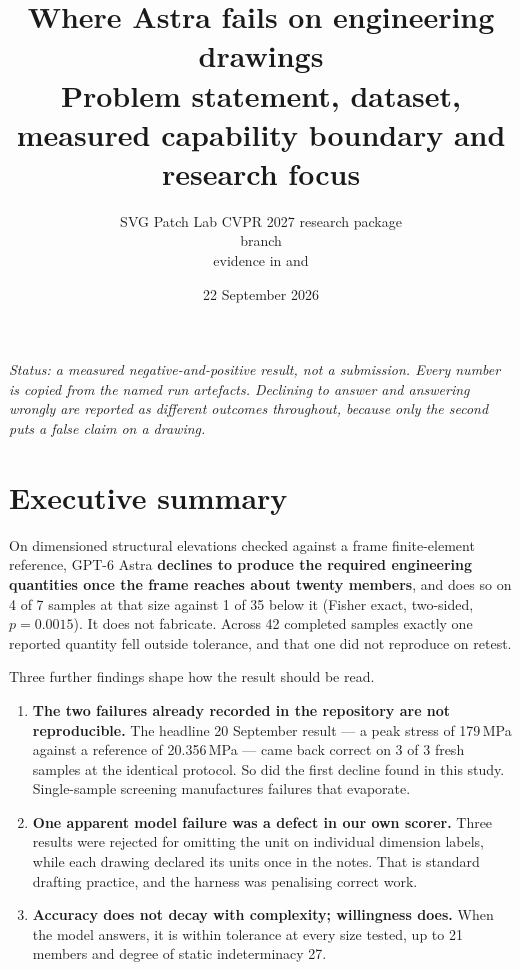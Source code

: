 \documentclass[11pt,a4paper]{article}
\title{\color{researchblue}\LARGE Where Astra fails on engineering drawings\\[6pt]
\Large Problem statement, dataset, measured capability boundary and research focus}
\author{SVG Patch Lab \quad\textbullet\quad CVPR 2027 research package\\
\small branch \code{cvpr2027-research-package}\\
\small evidence in \code{runs/eng-frame-*} and \code{runs/eng-frame-aggregate.json}}
\date{22 September 2026}
\newcommand{\code}[1]{\path{#1}}
\begin{document}
\maketitle

\begin{center}
\small\itshape
Status: a measured negative-and-positive result, not a submission. Every number is copied from the
named run artefacts. Declining to answer and answering wrongly are reported as different outcomes
throughout, because only the second puts a false claim on a drawing.
\end{center}

\tableofcontents

\section{Executive summary}

On dimensioned structural elevations checked against a frame finite-element reference, GPT-6 Astra
\textbf{declines to produce the required engineering quantities once the frame reaches about twenty
members}, and does so on 4 of 7 samples at that size against 1 of 35 below it (Fisher exact,
two-sided, $p = 0.0015$). It does not fabricate. Across 42 completed samples exactly one reported
quantity fell outside tolerance, and that one did not reproduce on retest.

Three further findings shape how the result should be read.

\begin{enumerate}
\item \textbf{The two failures already recorded in the repository are not reproducible.} The headline
      20 September result --- a peak stress of 179\,MPa against a reference of 20.356\,MPa --- came
      back correct on 3 of 3 fresh samples at the identical protocol. So did the first decline found
      in this study. Single-sample screening manufactures failures that evaporate.
\item \textbf{One apparent model failure was a defect in our own scorer.} Three results were rejected
      for omitting the unit \code{mm} on individual dimension labels, while each drawing declared its
      units once in the notes. That is standard drafting practice, and the harness was penalising
      correct work.
\item \textbf{Accuracy does not decay with complexity; willingness does.} When the model answers, it
      is within tolerance at every size tested, up to 21 members and degree of static indeterminacy 27.
\end{enumerate}
\end{document}

